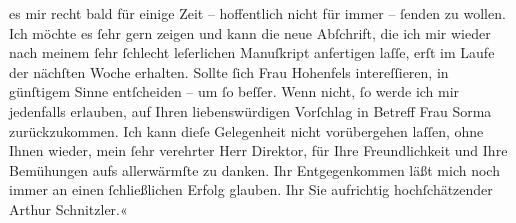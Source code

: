 \begin{ledgroupsized}[t]{13cm}
               es mir recht bald für einige Zeit – hoffentlich nicht für immer – ſenden zu wollen.
               Ich möchte es ſehr gern \label{K_L00403-1v}\label{K_L00403-1h} zeigen und kann die
               neue Abſchrift, die ich mir wieder nach meinem ſehr ſchlecht leſerlichen Manuſkript
               anfertigen laſſe, erſt im Laufe der nächſten Woche erhalten. Sollte ſich Frau Hohenfels intereſſieren, in günſtigem Sinne
               entſcheiden – um ſo beſſer. Wenn nicht, ſo werde ich mir jedenfalls erlauben, auf
               Ihren liebenswürdigen Vorſchlag in Betreff Frau Sorma zurückzukommen. Ich kann dieſe Gelegenheit nicht vorübergehen laſſen,
               ohne Ihnen wieder, mein ſehr verehrter Herr Direktor, für Ihre Freundlichkeit und
               Ihre Bemühungen aufs allerwärmſte zu danken. Ihr Entgegenkommen läßt mich noch immer
               an einen ſchließlichen Erfolg glauben. Ihr Sie aufrichtig hochſchätzender Arthur
               Schnitzler.«\pend
           
         
         \endnumbering{}\end{ledgroupsized}  \newcommand{\dateiname}{L00403}\newcommand{\titel}{Arthur Schnitzler an Max Burckhard, 21. 11. 1894}\newcommand{\editorInnen}{Martin Anton Müller und Gerd-Hermann Susen}
      